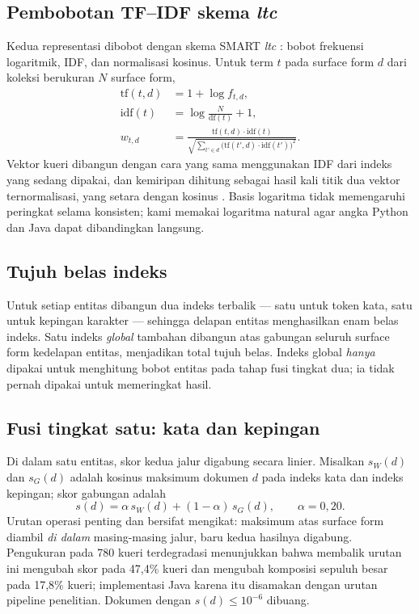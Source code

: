 \documentclass[journal,twoside,web]{ieeecolor}
\begin{document}
\subsection{Pembobotan TF--IDF skema \emph{ltc}}

Kedua representasi dibobot dengan skema SMART \emph{ltc} \cite{salton1988}: bobot
frekuensi logaritmik, IDF, dan normalisasi kosinus. Untuk term $t$ pada surface
form $d$ dari koleksi berukuran $N$ surface form,
\begin{align}
\mathrm{tf}(t,d) &= 1 + \log f_{t,d}, \label{eq:tf}\\
\mathrm{idf}(t)  &= \log \frac{N}{\mathrm{df}(t)} + 1, \label{eq:idf}\\
w_{t,d} &= \frac{\mathrm{tf}(t,d)\cdot \mathrm{idf}(t)}
                {\sqrt{\sum_{t'\in d}\big(\mathrm{tf}(t',d)\cdot\mathrm{idf}(t')\big)^2}}.
\label{eq:ltc}
\end{align}
Vektor kueri dibangun dengan cara yang sama menggunakan IDF dari indeks yang
sedang dipakai, dan kemiripan dihitung sebagai hasil kali titik dua vektor
ternormalisasi, yang setara dengan kosinus \cite{salton1975}. Basis logaritma
tidak memengaruhi peringkat selama konsisten; kami memakai logaritma natural agar
angka Python dan Java dapat dibandingkan langsung.

\subsection{Tujuh belas indeks}

Untuk setiap entitas dibangun dua indeks terbalik --- satu untuk token kata, satu
untuk kepingan karakter --- sehingga delapan entitas menghasilkan enam belas
indeks. Satu indeks \emph{global} tambahan dibangun atas gabungan seluruh surface
form kedelapan entitas, menjadikan total tujuh belas. Indeks global \emph{hanya}
dipakai untuk menghitung bobot entitas pada tahap fusi tingkat dua; ia tidak
pernah dipakai untuk memeringkat hasil.

\subsection{Fusi tingkat satu: kata dan kepingan}

Di dalam satu entitas, skor kedua jalur digabung secara linier. Misalkan
$s_W(d)$ dan $s_G(d)$ adalah kosinus maksimum dokumen $d$ pada indeks kata dan
indeks kepingan; skor gabungan adalah
\begin{equation}
s(d) = \alpha\, s_W(d) + (1-\alpha)\, s_G(d), \qquad \alpha = 0{,}20.
\label{eq:fusi1}
\end{equation}
Urutan operasi penting dan bersifat mengikat: maksimum atas surface form diambil
\emph{di dalam} masing-masing jalur, baru kedua hasilnya digabung. Pengukuran
pada 780 kueri terdegradasi menunjukkan bahwa membalik urutan ini mengubah skor
pada 47,4\% kueri dan mengubah komposisi sepuluh besar pada 17,8\% kueri;
implementasi Java karena itu disamakan dengan urutan pipeline penelitian.
Dokumen dengan $s(d) \le 10^{-6}$ dibuang.
\end{document}
